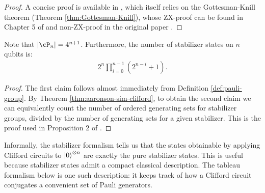 \begin{proof}
A concise proof is available in \cite{sim_stab_circuits}, which itself relies on the Gottesman-Knill theorem (Theorem \ref{thm:Gottesman-Knill}), whose ZX-proof can be found in Chapter 5 of \cite{PQS} and non-ZX-proof in the original paper \cite{Gottesman-Knill}.
\end{proof}

\begin{lemma}
\label{lemma:size-of-pauli-stab}
Note that $|\cP_n| = 4^{n+1}$. Furthermore, the number of stabilizer states on $n$ qubits is:
\begin{align}
    2^n \prod_{i=0}^{n-1} (2^{n-i} + 1).
\end{align}
\end{lemma}

\begin{proof}
The first claim follows almost immediately from Definition \ref{def:pauli-group}. By Theorem \ref{thm:aaronson-sim-clifford}, to obtain the second claim we can equivalently count the number of ordered generating sets for stabilizer groups, divided by the number of generating sets for a given stabilizer. This is the proof used in Proposition 2 of \cite{sim_stab_circuits}.
\end{proof}

Informally, the stabilizer formalism tells us that the states obtainable by
applying Clifford circuits to $\ket{0}^{\otimes n}$ are exactly the pure
stabilizer states. This is useful because stabilizer states admit a compact
classical description. The tableau formalism below is one such description: it
keeps track of how a Clifford circuit conjugates a convenient set of Pauli
generators.

